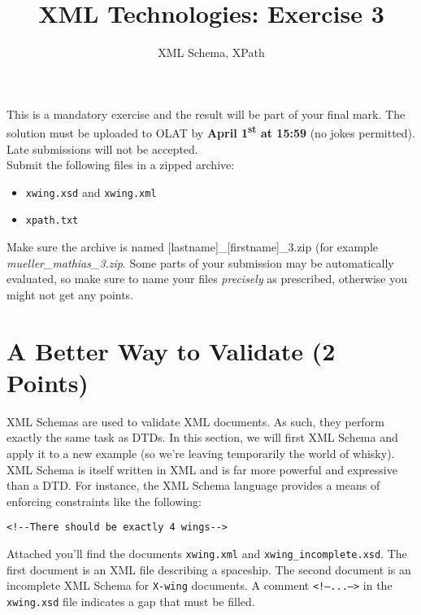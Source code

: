 \documentclass[a4paper, 12pt]{scrartcl}
\title{XML Technologies: Exercise 3}
\date{}
\subtitle{XML Schema, XPath}
\begin{document}
\maketitle\vspace{-12ex}

\noindent This is a mandatory exercise and the result will be part of your final mark. The solution must be uploaded to OLAT by \textbf{April 1\textsuperscript{st} at 15:59} (no jokes permitted). Late submissions will not be accepted.\\


\noindent Submit the following files in a zipped archive:
\begin{itemize}
\item \texttt{xwing.xsd} and \texttt{xwing.xml}
\item \texttt{xpath.txt}
\end{itemize}

\noindent Make sure the archive is named [lastname]\_[firstname]\_3.zip (for example \textit{mueller\_mathias\_3.zip}. Some parts of your submission may be automatically evaluated, so make sure to name your files \textit{precisely} as prescribed, otherwise you might not get any points.




\section{A Better Way to Validate (2 Points)}

XML Schemas are used to validate XML documents. As such, they perform exactly the same task as DTDs. In this section, we will first XML Schema and apply it to a new example (so we're leaving temporarily the world of whisky). \\

XML Schema is itself written in XML and is far more powerful and expressive than a DTD. For instance, the XML Schema language provides a means of enforcing constraints like the following:

\lstset{language=XML}
\begin{lstlisting}
<!--There should be exactly 4 wings-->
\end{lstlisting}

\noindent Attached you'll find the documents \texttt{xwing.xml} and \texttt{xwing\_incomplete.xsd}. The first document is an XML file describing a spaceship. The second document is an incomplete XML Schema for \texttt{X-wing} documents. A comment \texttt{<!--...-->} in the \texttt{xwing.xsd} file indicates a gap that must be filled. \\
\end{document}
